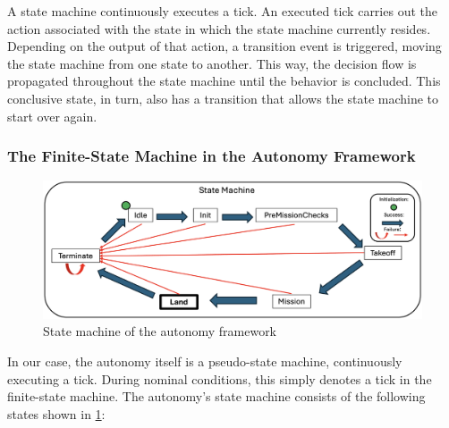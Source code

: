 A state machine continuously executes a tick. An executed tick carries out the action associated with the state in which the state machine currently resides. Depending on the output of that action, a transition event is triggered, moving the state machine from one state to another. This way, the decision flow is propagated throughout the state machine until the behavior is concluded. This conclusive state, in turn, also has a transition that allows the state machine to start over again.

\clearpage %

\subsubsection{The Finite-State Machine in the Autonomy Framework}

\begin{figure}[ht!]
    \centering
    \includegraphics[scale=0.17]{images/system_overview/state_machine.png}
    \caption{State machine of the autonomy framework}
    \label{fig:state_machine}
\end{figure}

In our case, the autonomy itself is a pseudo-state machine, continuously executing a tick. During nominal conditions, this simply denotes a tick in the finite-state machine. The autonomy's state machine consists of the following states shown in \cref{fig:state_machine}: 

